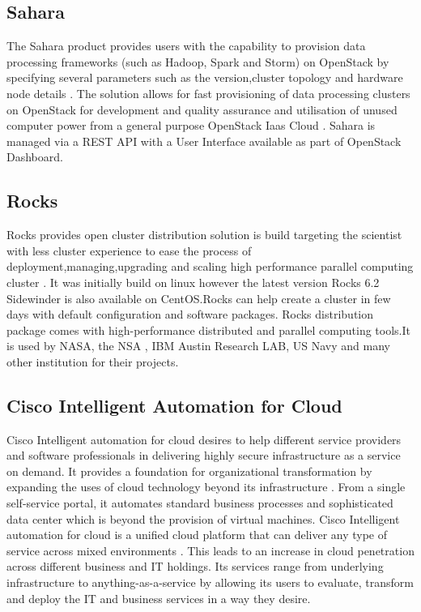 {     \pv

\subsection{Sahara}

     The Sahara product provides users with the capability to
     provision data processing frameworks (such as Hadoop, Spark and
     Storm) on OpenStack by specifying several
     parameters such as the version,cluster topology and hardware node
     details \cite{www-openStack}. The solution allows
     for fast provisioning of data processing clusters on OpenStack
     for development and quality assurance and utilisation of unused
     computer power from a general purpose OpenStack Iaas Cloud \cite{www-Sahara}.
     Sahara
     is managed via a REST API with a User Interface available as part
     of OpenStack Dashboard.

     \pv

\subsection{Rocks}

     Rocks provides open cluster distribution
     solution is build targeting the scientist with less cluster
     experience to ease the process of deployment,managing,upgrading
     and scaling high performance parallel computing cluster \cite{www-rockscluster}.
     It was
     initially build on linux however the latest version Rocks 6.2
     Sidewinder is also available on CentOS.Rocks can help create a
     cluster in few days with default configuration and software
     packages.  Rocks distribution package comes with high-performance
     distributed and parallel computing tools.It is used by NASA, the
     NSA , IBM Austin Research LAB, US Navy and many other institution
     for their projects.

     \pv

\subsection{Cisco Intelligent Automation for Cloud}

     Cisco Intelligent automation for cloud desires to help different
     service providers and software professionals in delivering highly
     secure infrastructure as a service on demand. It provides a
     foundation for organizational transformation by expanding the
     uses of cloud technology beyond its infrastructure
     \cite{cis1}. From a single self-service portal, it automates
     standard business processes and sophisticated data center which
     is beyond the provision of virtual machines. Cisco Intelligent
     automation for cloud is a unified cloud platform that can deliver
     any type of service across mixed environments \cite{cis2}. This
     leads to an increase in cloud penetration across different
     business and IT holdings. Its services range from underlying
     infrastructure to anything-as-a-service by allowing its users to
     evaluate, transform and deploy the IT and business services in a
     way they desire.

}
